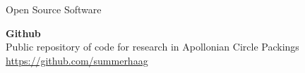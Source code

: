 \documentclass{resume} %
\begin{document}



\begin{rSection}{Open Source Software}

{\bf Github} \\
Public repository of code for research in Apollonian Circle Packings \hfill \href{https://github.com/summerhaag}{https://github.com/summerhaag} \\

\end{rSection}
\end{document}
